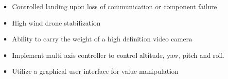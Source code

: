 \begin{itemize}
	\item Controlled landing upon loss of communication or component failure
	\item High wind drone stabilization
	\item Ability to carry the weight of a high definition video camera
	\item Implement multi axis controller to control altitude, yaw, pitch and roll.
	\item Utilize a graphical user interface for value manipulation
\end{itemize}
